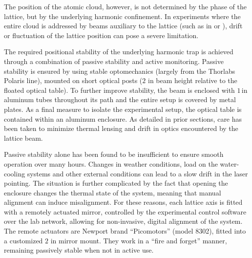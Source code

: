 \documentclass[twocolumn,aps,pra,showpacs,preprintnumbers,bibnotes]{revtex4-1}
\begin{document}
The position of the atomic cloud, however, is not determined by the phase of the lattice, but by the underlying harmonic confinement. 
In experiments where the entire cloud is addressed by beams auxiliary to the lattice (such as in \cite{Mazurenko2016} or \cite{Choi2016}), drift or fluctuation of the lattice position can pose a severe limitation.

The required positional stability of the underlying harmonic trap is achieved through a combination of passive stability and active monitoring. 
Passive stability is ensured by using stable optomechanics (largely from the Thorlabs Polaris line), mounted on short optical posts ($2$ in beam height relative to the floated optical table).
To further improve stability, the beam is enclosed with $1\,$in aluminum tubes throughout its path and the entire setup is covered by metal plates.
As a final measure to isolate the experimental setup, the optical table is contained within an aluminum enclosure. As detailed in prior sections, care has been taken to minimize thermal lensing and drift in optics encountered by the lattice beam.

Passive stability alone has been found to be insufficient to ensure smooth operation over many hours. Changes in weather conditions, load on the water-cooling systems and other external conditions can lead to a slow drift in the laser pointing.
The situation is further complicated by the fact that opening the enclosure changes the thermal state of the system, meaning that manual alignment can induce misalignment. 
For these reasons, each lattice axis is fitted with a remotely actuated mirror, controlled by the experimental control software over the lab network, allowing for non-invasive, digital alignment of the system. 
The remote actuators are Newport brand ``Picomotors'' (model 8302), fitted into a customized $2$ in mirror mount.
They work in a ``fire and forget'' manner, remaining passively stable when not in active use.
\end{document}
